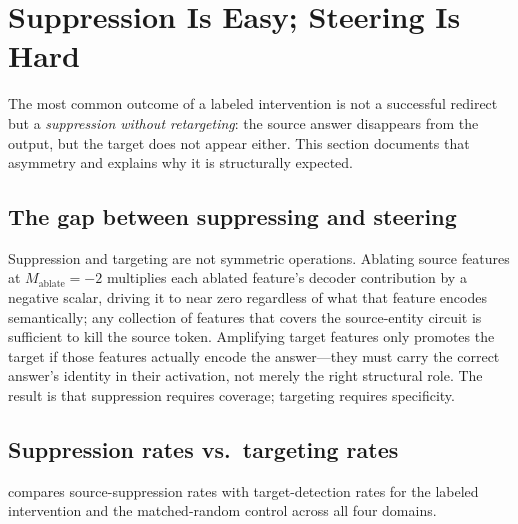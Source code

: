 \section{Suppression Is Easy; Steering Is Hard}
\label{appx:suppression}

The most common outcome of a labeled intervention is not a successful redirect but a \emph{suppression without retargeting}: the source answer disappears from the output, but the target does not appear either. This section documents that asymmetry and explains why it is structurally expected.

\subsection{The gap between suppressing and steering}

Suppression and targeting are not symmetric operations. Ablating source features at $M_{\mathrm{ablate}}{=}{-}2$ multiplies each ablated feature's decoder contribution by a negative scalar, driving it to near zero regardless of what that feature encodes semantically; any collection of features that covers the source-entity circuit is sufficient to kill the source token. Amplifying target features only promotes the target if those features actually encode the answer---they must carry the correct answer's identity in their activation, not merely the right structural role. The result is that suppression requires coverage; targeting requires specificity.

\subsection{Suppression rates vs.\ targeting rates}

 compares source-suppression rates with target-detection rates for the labeled intervention and the matched-random control across all four domains.

